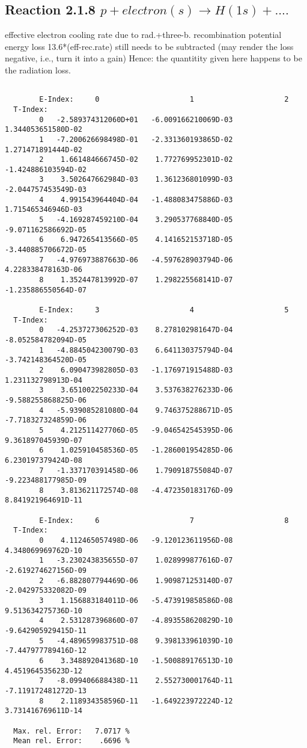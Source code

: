 \documentclass[12pt]{article}
\begin{document}
\subsection{
  Reaction 2.1.8  $p + electron(s)  \rightarrow H(1s) + ....$
}

   effective electron cooling rate due to rad.+three-b. recombination
   potential energy loss 13.6*(eff-rec.rate) still needs to be
   subtracted (may render the loss negative, i.e., turn it into a gain)
   Hence: the quantitity given here happens to be the radiation loss.

\begin{small}\begin{verbatim}

        E-Index:     0                     1                     2
  T-Index:
        0   -2.589374312060D+01   -6.009166210069D-03    1.344053651580D-02
        1   -7.200626698498D-01   -2.331360193865D-02    1.271471891444D-02
        2    1.661484666745D-02    1.772769952301D-02   -1.424886103594D-02
        3    3.502647662984D-03    1.361236801099D-03   -2.044757453549D-03
        4    4.991543964404D-04   -1.488083475886D-03    1.715465346946D-03
        5   -4.169287459210D-04    3.290537768840D-05   -9.071162586692D-05
        6    6.947265413566D-05    4.141652153718D-05   -3.440885706672D-05
        7   -4.976973887663D-06   -4.597628903794D-06    4.228338478163D-06
        8    1.352447813992D-07    1.298225568141D-07   -1.235886550564D-07

        E-Index:     3                     4                     5
  T-Index:
        0   -4.253727306252D-03    8.278102981647D-04   -8.052584782094D-05
        1   -4.884504230079D-03    6.641130375794D-04   -3.742148364520D-05
        2    6.090473982805D-03   -1.176971915488D-03    1.231132798913D-04
        3    3.651002250233D-04    3.537638276233D-06   -9.588255868825D-06
        4   -5.939085281080D-04    9.746375288671D-05   -7.718327324859D-06
        5    4.212511427706D-05   -9.046542545395D-06    9.361897045939D-07
        6    1.025910458536D-05   -1.286001954285D-06    6.230197379424D-08
        7   -1.337170391458D-06    1.790918755084D-07   -9.223488177985D-09
        8    3.813621172574D-08   -4.472350183176D-09    8.841921964691D-11

        E-Index:     6                     7                     8
  T-Index:
        0    4.112465057498D-06   -9.120123611956D-08    4.348069969762D-10
        1   -3.230243835655D-07    1.028999877616D-07   -2.619274627156D-09
        2   -6.882807794469D-06    1.909871253140D-07   -2.042975332082D-09
        3    1.156883184011D-06   -5.473919858586D-08    9.513634275736D-10
        4    2.531287396860D-07   -4.893558620829D-10   -9.642905929415D-11
        5   -4.489659983751D-08    9.398133961039D-10   -7.447977789416D-12
        6    3.348892041368D-10   -1.500889176513D-10    4.451964535623D-12
        7   -8.099406688438D-11    2.552730001764D-11   -7.119172481272D-13
        8    2.118934358596D-11   -1.649223972224D-12    3.731416769611D-14

  Max. rel. Error:   7.0717 %
  Mean rel. Error:    .6696 %


\end{verbatim}\end{small}
\end{document}
